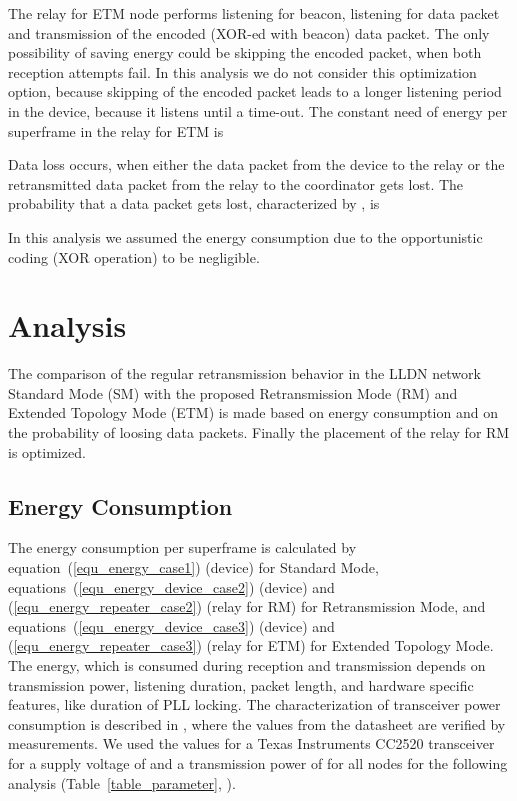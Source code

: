 \documentclass[times,10pt,twocolumn]{article}
\begin{document}
The relay for ETM node performs listening for beacon, listening for data packet and transmission of the encoded (XOR-ed with beacon) data packet. The only possibility of saving energy could be skipping the encoded packet, when both reception attempts fail. In this analysis we do not consider this optimization option, because skipping of the encoded packet leads to a longer listening period in the device, because it listens until a time-out. The constant need of energy per superframe in the relay for ETM is


Data loss occurs, when either the data packet from the device to the relay or the retransmitted data packet from the relay to the coordinator gets lost. The probability that a data packet gets lost, characterized by , is


In this analysis we assumed the energy consumption due to the opportunistic coding (XOR operation) to be negligible.


\section{Analysis}
\label{section_analysis}
The comparison of the regular retransmission behavior in the LLDN network Standard Mode (SM) with the proposed Retransmission Mode (RM) and Extended Topology Mode (ETM) is made based on energy consumption and on the probability of loosing data packets.  Finally the placement of the relay for RM is optimized.

\subsection{Energy Consumption}
\label{subsection_compare_energy_consumption}
The energy consumption per superframe is calculated by equation~(\ref{equ_energy_case1}) (device) for Standard Mode, equations~(\ref{equ_energy_device_case2}) (device) and (\ref{equ_energy_repeater_case2}) (relay for RM) for Retransmission Mode, and equations~(\ref{equ_energy_device_case3}) (device) and (\ref{equ_energy_repeater_case3}) (relay for ETM) for Extended Topology Mode. The energy, which is consumed during reception and transmission depends on transmission power, listening duration, packet length, and hardware specific features, like duration of PLL locking. The characterization of transceiver power consumption is described in \cite{TDMA_for_testbed}, where the values from the datasheet are verified by measurements. We used the values for a Texas Instruments CC2520 transceiver for a supply voltage of  and a transmission power of  for all nodes for the following analysis (Table~\ref{table_parameter}, \cite{TDMA_for_testbed}).
\end{document}
